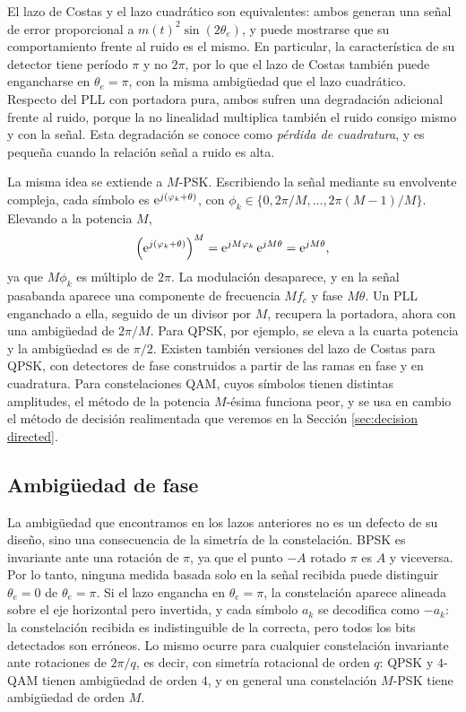 El lazo de Costas y el lazo cuadrático son equivalentes: ambos generan una señal de error proporcional a $m(t)^2\sin(2\theta_e)$, y puede mostrarse que su comportamiento frente al ruido es el mismo. En particular, la característica de su detector tiene período $\pi$ y no $2\pi$, por lo que el lazo de Costas también puede engancharse en $\theta_e=\pi$, con la misma ambigüedad que el lazo cuadrático. Respecto del PLL con portadora pura, ambos sufren una degradación adicional frente al ruido, porque la no linealidad multiplica también el ruido consigo mismo y con la señal. Esta degradación se conoce como \emph{pérdida de cuadratura}, y es pequeña cuando la relación señal a ruido es alta.

La misma idea se extiende a $M$-PSK. Escribiendo la señal mediante su envolvente compleja, cada símbolo es $\mathrm{e}^{j(\varphi_k+\theta)}$, con $\phi_k\in\{0,2\pi/M,\ldots,2\pi(M-1)/M\}$. Elevando a la potencia $M$,
\begin{equation*}
    \left(\mathrm{e}^{j(\varphi_k+\theta)}\right)^M = \mathrm{e}^{jM\varphi_k}\,\mathrm{e}^{jM\theta} = \mathrm{e}^{jM\theta},
\end{equation*}
ya que $M\phi_k$ es múltiplo de $2\pi$. La modulación desaparece, y en la señal pasabanda aparece una componente de frecuencia $Mf_c$ y fase $M\theta$. Un PLL enganchado a ella, seguido de un divisor por $M$, recupera la portadora, ahora con una ambigüedad de $2\pi/M$. Para QPSK, por ejemplo, se eleva a la cuarta potencia y la ambigüedad es de $\pi/2$. Existen también versiones del lazo de Costas para QPSK, con detectores de fase construidos a partir de las ramas en fase y en cuadratura. Para constelaciones QAM, cuyos símbolos tienen distintas amplitudes, el método de la potencia $M$-ésima funciona peor, y se usa en cambio el método de decisión realimentada que veremos en la Sección \ref{sec:decision directed}.

\subsection{Ambigüedad de fase}\label{sec:ambiguedad fase}

La ambigüedad que encontramos en los lazos anteriores no es un defecto de su diseño, sino una consecuencia de la simetría de la constelación. BPSK es invariante ante una rotación de $\pi$, ya que el punto $-A$ rotado $\pi$ es $A$ y viceversa. Por lo tanto, ninguna medida basada solo en la señal recibida puede distinguir $\theta_e=0$ de $\theta_e=\pi$. Si el lazo engancha en $\theta_e=\pi$, la constelación aparece alineada sobre el eje horizontal pero invertida, y cada símbolo $a_k$ se decodifica como $-a_k$: la constelación recibida es indistinguible de la correcta, pero todos los bits detectados son erróneos. Lo mismo ocurre para cualquier constelación invariante ante rotaciones de $2\pi/q$, es decir, con simetría rotacional de orden $q$: QPSK y $4$-QAM tienen ambigüedad de orden $4$, y en general una constelación $M$-PSK tiene ambigüedad de orden $M$.

